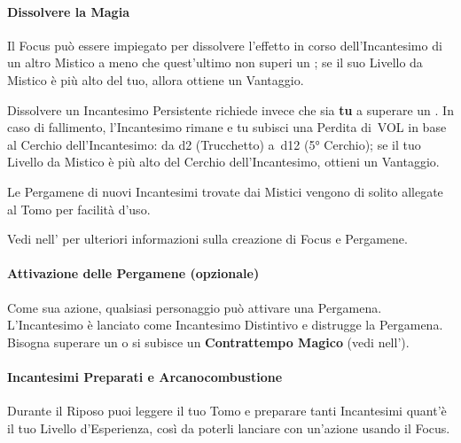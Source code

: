 \documentclass[itdr]{subfiles}
\begin{document}
\paragraph{Dissolvere la Magia}
Il Focus può essere impiegato per dissolvere l’effetto in corso dell’Incantesimo di un altro Mistico a meno che quest’ultimo non superi un ; se il suo Livello da Mistico è più alto del tuo, allora ottiene un Vantaggio. 

Dissolvere un Incantesimo Persistente richiede invece che sia \textbf{tu} a superare un . In caso di fallimento, l’Incantesimo rimane e tu subisci una Perdita di~VOL in base al Cerchio dell’Incantesimo: da d2 (Trucchetto) a~d12 (5° Cerchio); se il tuo Livello da Mistico è più alto del Cerchio dell’Incantesimo, ottieni un Vantaggio.

\vfill
\begin{dbox}
	Le Pergamene di nuovi Incantesimi trovate dai Mistici vengono di solito allegate al Tomo per facilità d’uso.

	Vedi \textbf{} nell'\mbox{\textbf{}} per ulteriori informazioni sulla creazione di Focus e Pergamene.
\end{dbox}

\vfill
{}
\begin{dbox}
	\paragraph{Attivazione delle Pergamene (opzionale)}
	Come sua azione, qualsiasi personaggio può attivare una Pergamena. L’Incantesimo è lanciato come Incantesimo Distintivo e distrugge la Pergamena. Bisogna superare un  o si subisce un \textbf{Contrattempo Magico} (vedi \textbf{} nell'\textbf{}).
\end{dbox}

\vfill

\paragraph{Incantesimi Preparati e Arcanocombustione}
Durante il Riposo puoi leggere il tuo Tomo e preparare tanti Incantesimi quant'è il tuo Livello d’Esperienza, così da poterli lanciare con un’azione usando il Focus.
\end{document}
